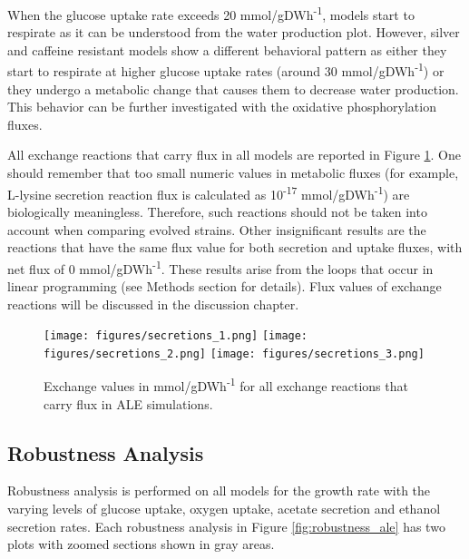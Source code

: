 When the glucose uptake rate exceeds 20 mmol/gDWh\textsuperscript{-1}, models start to respirate as it can be understood from the water production plot. However, silver and caffeine resistant models show a different behavioral pattern as either they start to respirate at higher glucose uptake rates (around 30 mmol/gDWh\textsuperscript{-1}) or they undergo a metabolic change that causes them to decrease water production. This behavior can be further  investigated with the oxidative phosphorylation fluxes.

All exchange reactions that carry flux in all models are reported in Figure \ref{fig:fba_exchanges_3}. One should remember that too small numeric values in metabolic fluxes (for example, L-lysine secretion reaction flux is calculated as 10\textsuperscript{-17} mmol/gDWh\textsuperscript{-1}) are biologically meaningless. Therefore, such reactions should not be taken into account when comparing evolved strains. Other insignificant results are the reactions that have the same flux value for both secretion and uptake fluxes, with net flux of 0 mmol/gDWh\textsuperscript{-1}. These results arise from the loops that occur in linear programming (see Methods section for details). Flux values of exchange reactions will be discussed in the discussion chapter.

\begin{figure}[H]
  \begin{center}
  \texttt{[image: figures/secretions\_1.png]}
  \texttt{[image: figures/secretions\_2.png]}
  \texttt{[image: figures/secretions\_3.png]}
  \caption[Exchange values in mmol/gDWh\textsuperscript{-1} for all exchange reactions that carry flux in ALE simulations]{Exchange values in mmol/gDWh\textsuperscript{-1} for all exchange reactions that carry flux in ALE simulations.}
  \label{fig:fba_exchanges_3}
  \end{center}
  \end{figure}
\vspace{-1.0cm}

\subsection{Robustness Analysis}

Robustness analysis is performed on all models for the growth rate with the varying levels of glucose uptake, oxygen uptake, acetate secretion and ethanol secretion rates. Each robustness analysis in Figure \ref{fig:robustness_ale} has two plots with zoomed sections shown in gray areas.

